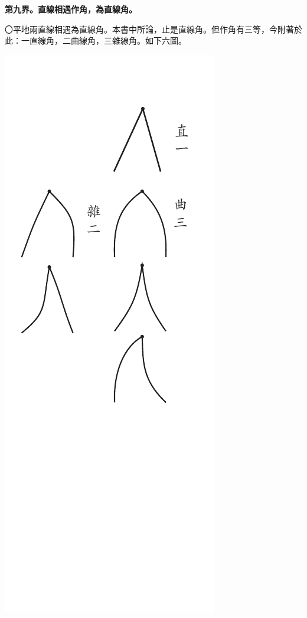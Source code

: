 \documentclass[12pt,b5paper,landscape]{article}
\newcommand{\bcom}[1]{〇#1}
\newcommand{\cthm}[1]{{
\vspace{8pt}

\bfseries #1}}
\begin{document}
\begin{multicols}{2}
\cthm{第九界。直線相遇作角，為直線角。}\bcom{平地兩直線相遇為直線角。本書中所論，止是直線角。但作角有三等，今附著於此：一直線角，二曲線角，三雜線角。如下六圖。}
\begin{center}
\includegraphics[angle=90]{eu9}
\end{center}


\end{multicols}
\end{document}
